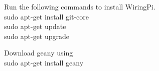 \begin{problem}
Run the following commands to install WiringPi.
\\
sudo apt-get install git-core
\\
sudo apt-get update
\\
sudo apt-get upgrade
%
\end{problem}
%
\begin{problem}
Download geany using
\\
sudo apt-get install geany
\end{problem}
%

%

